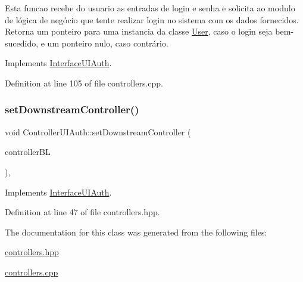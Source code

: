 Esta funcao recebe do usuario as entradas de login e senha e solicita ao modulo de lógica de negócio que tente realizar login no sistema com os dados fornecidos. Retorna um ponteiro para uma instancia da classe \hyperlink{class_user}{User}, caso o login seja bem-\/sucedido, e um ponteiro nulo, caso contrário. 

Implements \hyperlink{class_interface_u_i_auth_aa1c72a24f846accc6417a3b866ec9095}{Interface\+U\+I\+Auth}.



Definition at line 105 of file controllers.\+cpp.

\mbox{\label{class_controller_u_i_auth_a38a73726a7a7d7909cf078dd781d9dc3}} 
\subsubsection{\texorpdfstring{set\+Downstream\+Controller()}{setDownstreamController()}}
{\footnotesize\ttfamily void Controller\+U\+I\+Auth\+::set\+Downstream\+Controller (\begin{DoxyParamCaption}\item[{\hyperlink{class_interface_b_l_auth}{Interface\+B\+L\+Auth} $\ast$}]{controller\+BL }\end{DoxyParamCaption})\hspace{0.3cm}{\ttfamily [inline]}, {\ttfamily [virtual]}}



Implements \hyperlink{class_interface_u_i_auth_af955fb60079d683f906912feb540c3ec}{Interface\+U\+I\+Auth}.



Definition at line 47 of file controllers.\+hpp.



The documentation for this class was generated from the following files\+:\begin{DoxyCompactItemize}
\item 
\hyperlink{controllers_8hpp}{controllers.\+hpp}\item 
\hyperlink{controllers_8cpp}{controllers.\+cpp}\end{DoxyCompactItemize}

